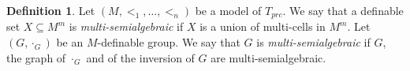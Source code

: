 \documentclass[12pt]{article}
\newtheorem{prop}[thm]{Proposition}
\theoremstyle{definition}
\newtheorem{defi}[thm]{Definition}
\theoremstyle{mystyle}
\theoremstyle{remark}
\newcommand{\acl}{\mathrm{acl}}
\newcommand{\tp}{\mathrm{tp}}
\begin{document}
\begin{comment}
\begin{prop}\label{prop_groupconf}
Let $M$ be a model of $T_{prc}$ and let $M_0\prec M$, $M$ is $|M_0|^{+}$-saturated. Let $G$ be a definable group in $M$ and let $p$ be a global type in $G$ strongly f-generic over $M_0$. Let $a\models p|M$, $b\models p|Ma$, and $c=ab$. Then $\tp(c/Ma)$ if strongly f-generic over $M_0$ and there is an $M$-definable algebraic group $H$ and dimension-generic elements $a', b', c'\in H(\mathcal{U})$ such that $a'\cdot b' = c'$ and $\acl(Ma)=\acl(Ma')$, $\acl(Mb)=\acl(Mb')$ and $\acl(Mc)=\acl(Mc')$.
\end{prop}
\begin{proof}
This is Proposition 3.1 of \cite{HrPi}. We modified the
statement to additionally require that we can choose $a,b,c$ and
that we can take the set $A$ to be inside $M$. The reader can verify that those
conditions can be met by the construction done in the proof.
\end{proof}


We go through the proof to see that this can be arranged. The
elements $a,b,c$ in the proof were picked at the beginning and
never changed in the proof, so we only need to verify that all the
base extensions done during the construction can take place inside
$M$. But this holds since whenever a new point is introduced, it
is chosen independently (in the sense of dimension) from all the
points chosen so far, and we can always do that inside $M$. More
precisely, following the notations of the proof: in Lemma 3.2, we
first chose $x'$ in $G(M)$, then pick $z_1 \in G(M)$ and this
ensures that $A_2 \subseteq M$. The set $A$ after the proof of 3.2
is equal to $\acl(A_2)\cap F$ and is therefore in $M$. There are
only two base extensions left, done at the very end. We chose
$\sigma_1 \in M$ and have $A_1 = \acl(A,\sigma_1)\cap F\subseteq
M$ (it seems that there is a typo in the paper, it says $A_1 =
\acl(A,\sigma)\cap F$ instead). Finally, take $\tau_1$ such that
$b_2 := \tau_1^{-1} \cdot b_1$ is in $M$. This can be ensured for
example by choosing $b_2$ first. Then $A_2 \subseteq M$ and we are
done.
\end{comment}

\begin{defi}
Let $(M, <_1, \ldots, <_n)$ be a model of $T_{prc}$. We say that a
definable set $X \subseteq M^m$ is \emph{multi-semialgebraic} if
$X$ is a union of multi-cells in $M^m$. Let $(G, \cdot_G)$ be an
$M$-definable group. We say that $G$ is \emph{multi-semialgebraic}
if $G$, the graph of $\cdot_G$ and of the inversion of $G$ are
multi-semialgebraic.
\end{defi}
\end{document}

